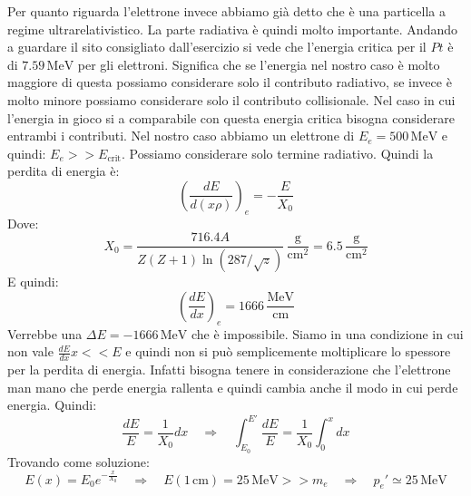 Per quanto riguarda l'elettrone invece abbiamo già detto che è una particella a regime ultrarelativistico. La parte radiativa è quindi molto importante. Andando a guardare il sito consigliato dall'esercizio si vede che l'energia critica per il $Pt$ è di $7.59\,\mathrm{MeV}$ per gli elettroni. Significa che se l'energia nel nostro caso è molto maggiore di questa possiamo considerare solo il contributo radiativo, se invece è molto minore possiamo considerare solo il contributo collisionale. Nel caso in cui l'energia in gioco si a comparabile con questa energia critica bisogna considerare entrambi i contributi. Nel nostro caso abbiamo un elettrone di $E_e=500\,\mathrm{MeV}$ e quindi: $E_e>>E_{\text{crit}}$. Possiamo considerare solo termine radiativo. Quindi la perdita di energia è:
\begin{equation}
     \left(\frac{dE}{d(x\rho)}\right)_e=-\frac{E}{X_0}
\end{equation}
Dove:
\begin{equation}
    X_0=\frac{716.4 A}{Z(Z+1)\ln({287/\sqrt{z}})}\,\frac{\mathrm{g}}{\mathrm{cm}^2}=6.5\,\frac{\mathrm{g}}{\mathrm{cm}^2}
\end{equation}
E quindi:
\begin{equation}
    \left(\frac{dE}{dx}\right)_e=1666\,\frac{\mathrm{MeV}}{\mathrm{cm}}
\end{equation}
Verrebbe una $\Delta E=-1666\,\mathrm{MeV}$ che è impossibile. Siamo in una condizione in cui non vale $\frac{dE}{dx}x<<E$ e quindi non si può semplicemente moltiplicare lo spessore per la perdita di energia. Infatti bisogna tenere in considerazione che l'elettrone man mano che perde energia rallenta e quindi cambia anche il modo in cui perde energia. Quindi:
\begin{equation}
    \frac{dE}{E}=\frac{1}{X_0}dx\quad \Rightarrow\quad\int_{E_0}^{E'}\frac{dE}{E}=\frac{1}{X_0}\int_0^xdx
\end{equation}
Trovando come soluzione:
\begin{equation}
    E(x)=E_0e^{-\frac{x}{X_0}} \quad \Rightarrow\quad E(1\,\mathrm{cm})=25\,\mathrm{MeV}>>m_e \quad \Rightarrow\quad p_e'\simeq25\,\mathrm{MeV}
\end{equation}